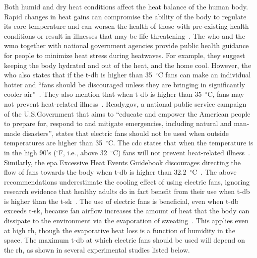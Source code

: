 Both humid and dry heat conditions affect the heat balance of the human body.
Rapid changes in heat gains can compromise the ability of the body to regulate its core temperature and can worsen the health of those with pre-existing health conditions or result in illnesses that may be life threatening~\cite{WMO2015}.
The \ac{who} and the \ac{wmo} together with national government agencies provide public health guidance for people to minimize heat stress during heatwaves.
For example, they suggest keeping the body hydrated and out of the heat, and the home cool.
However, the \ac{who} also states that if the \ac{t-db} is higher than 35~$^{\circ}$C fans can make an individual hotter and ``fans should be discouraged unless they are bringing in significantly cooler air''~\cite{WMO2015}.
They also mention that when \ac{t-db} is higher than 35~$^{\circ}$C, fans may not prevent heat-related illness~\cite{HeatandH28:online}.
Ready.gov, a national public service campaign of the U.S.\@ Government that aims to ``educate and empower the American people to prepare for, respond to and mitigate emergencies, including natural and man-made disasters'', states that electric fans should not be used when outside temperatures are higher than 35~$^{\circ}$C\@.
The \ac{cdc} states that when the temperature is in the high 90's ($^{\circ}$F, i.e., above 32~$^{\circ}$C) fans will not prevent heat-related illness~\cite{ExtremeH66:online}.
Similarly, the \ac{epa} Excessive Heat Events Guidebook discourages directing the flow of fans towards the body when \ac{t-db} is higher than 32.2~$^{\circ}$C~\cite{UnitedStatesEnvironmentalProtectionAgency2006}.
The above recommendations underestimate the cooling effect of using electric fans, ignoring research evidence that healthy adults do in fact benefit from their use when \ac{t-db} is higher than the \ac{t-sk}~\cite{Rate2015, Jay2015, Jay2019a, Rate2015, Gagnon2017}.
The use of electric fans is beneficial, even when \ac{t-db} exceeds \ac{t-sk}, because fan airflow increases the amount of heat that the body can dissipate to the environment via the evaporation of sweating~\cite{Jay2015}.
This applies even at high \ac{rh}, though the evaporative heat loss is a function of humidity in the space.
The maximum \ac{t-db} at which electric fans should be used will depend on the \ac{rh}, as shown in several experimental studies listed below.

